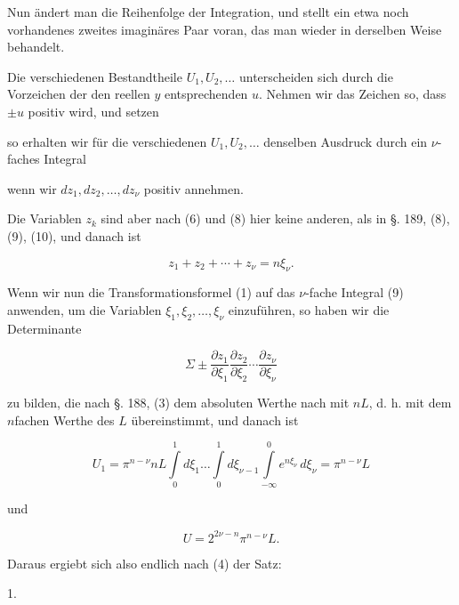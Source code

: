 Nun ändert man die Reihenfolge der Integration, und stellt ein etwa noch vorhandenes zweites imaginäres Paar voran, das man wieder in derselben Weise behandelt.

Die verschiedenen Bestandtheile $U_1, U_2, \ldots$ unterscheiden sich durch die Vorzeichen der den reellen $y$ entsprechenden $u$. Nehmen wir das Zeichen so, dass $\pm u$ positiv wird, und setzen


so erhalten wir für die verschiedenen $U_1, U_2, \ldots$ denselben Ausdruck durch ein $\nu$-faches Integral


wenn wir $dz_1, dz_2, \ldots, dz_\nu$ positiv annehmen.

Die Variablen $z_k$ sind aber nach (6) und (8) hier keine anderen, als in §. 189, (8), (9), (10), und danach ist

\[
z_1+z_2+\cdots+z_\nu = n\xi_\nu.
\]

Wenn wir nun die Transformationsformel (1) auf das $\nu$-fache Integral (9) anwenden, um die Variablen $\xi_1, \xi_2, \ldots, \xi_\nu$ einzuführen, so haben wir die Determinante

\[
\Sigma\pm\frac{\partial z_1}{\partial\xi_1}\frac{\partial z_2}{\partial\xi_2}\cdots\frac{\partial z_\nu}{\partial\xi_\nu}
\]

zu bilden, die nach §. 188, (3) dem absoluten Werthe nach mit $nL$, d. h. mit dem $n$fachen Werthe des  $L$ übereinstimmt, und danach ist

\[
U_1 = \pi^{n-\nu}nL\int\limits_0^1 d\xi_1\ldots\int\limits_0^1 d\xi_{\nu-1}\int\limits_{-\infty}^0 e^{n\xi_\nu}\,d\xi_\nu = \pi^{n-\nu}L
\]

und

\[
U = 2^{2\nu-n}\pi^{n-\nu}L.
\]

Daraus ergiebt sich also endlich nach (4) der Satz:

1. 



